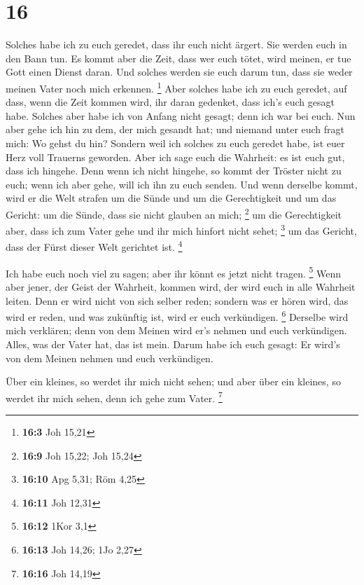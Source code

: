 \hypertarget{section-6}{%
\section{16}\label{section-6}}

 Solches habe ich zu euch geredet, dass ihr euch nicht
ärgert.  Sie werden euch in den Bann tun. Es kommt aber die
Zeit, dass wer euch tötet, wird meinen, er tue Gott einen Dienst daran.
 Und solches werden sie euch darum tun, dass sie weder
meinen Vater noch mich erkennen. \footnote{\textbf{16:3} Joh 15,21}
 Aber solches habe ich zu euch geredet, auf dass, wenn die
Zeit kommen wird, ihr daran gedenket, dass ich's euch gesagt habe.
Solches aber habe ich von Anfang nicht gesagt; denn ich war bei euch.
 Nun aber gehe ich hin zu dem, der mich gesandt hat; und
niemand unter euch fragt mich: Wo gehst du hin?  Sondern
weil ich solches zu euch geredet habe, ist euer Herz voll Trauerns
geworden.  Aber ich sage euch die Wahrheit: es ist euch gut,
dass ich hingehe. Denn wenn ich nicht hingehe, so kommt der Tröster
nicht zu euch; wenn ich aber gehe, will ich ihn zu euch senden.
 Und wenn derselbe kommt, wird er die Welt strafen um die
Sünde und um die Gerechtigkeit und um das Gericht:  um die
Sünde, dass sie nicht glauben an mich; \footnote{\textbf{16:9} Joh
  15,22; Joh 15,24}  um die Gerechtigkeit aber, dass ich
zum Vater gehe und ihr mich hinfort nicht sehet; \footnote{\textbf{16:10}
  Apg 5,31; Röm 4,25}  um das Gericht, dass der Fürst
dieser Welt gerichtet ist. \footnote{\textbf{16:11} Joh 12,31}

 Ich habe euch noch viel zu sagen; aber ihr könnt es jetzt
nicht tragen. \footnote{\textbf{16:12} 1Kor 3,1}  Wenn aber
jener, der Geist der Wahrheit, kommen wird, der wird euch in alle
Wahrheit leiten. Denn er wird nicht von sich selber reden; sondern was
er hören wird, das wird er reden, und was zukünftig ist, wird er euch
verkündigen. \footnote{\textbf{16:13} Joh 14,26; 1Jo 2,27} 
Derselbe wird mich verklären; denn von dem Meinen wird er's nehmen und
euch verkündigen.  Alles, was der Vater hat, das ist mein.
Darum habe ich euch gesagt: Er wird's von dem Meinen nehmen und euch
verkündigen.

 Über ein kleines, so werdet ihr mich nicht sehen; und aber
über ein kleines, so werdet ihr mich sehen, denn ich gehe zum Vater.
\footnote{\textbf{16:16} Joh 14,19}

